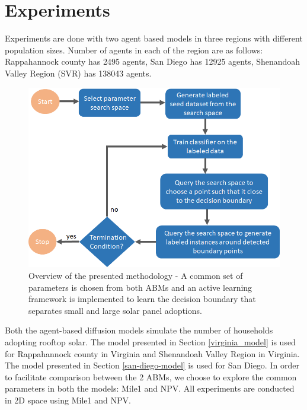 \section{Experiments}

Experiments are done with two agent based models in three regions with different population sizes. Number of agents in each of the region are as follows: Rappahannock county has 2495 agents, San Diego has 12925 agents, Shenandoah Valley Region (SVR) has 138043 agents. 

\begin{figure}
    \centering
    \includegraphics{AAMAS20Template-submission/figures/workflow.png}
    \caption{Overview of the presented methodology - A common set of parameters is chosen from both ABMs and an active learning framework is implemented to learn the decision boundary that separates small and large solar panel adoptions. }
    \label{fig:workflow}
\end{figure}

Both the agent-based diffusion models simulate the number of households adopting rooftop solar.
The model presented in Section \ref{virginia_model} is used for Rappahannock county in Virginia and Shenandoah Valley Region in Virginia. 
The model presented in Section \ref{san-diego-model} is used for San Diego.
In order to facilitate comparison between the 2 ABMs, we choose to explore the common parameters in both the models: Mile1 and NPV. All experiments are conducted in 2D space using Mile1 and NPV.

